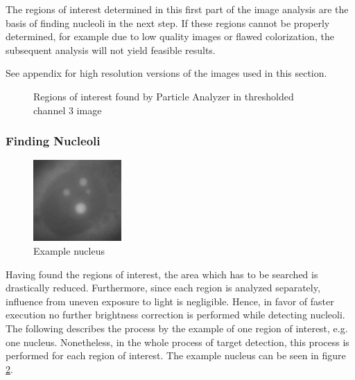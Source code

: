 \documentclass[a4paper, 12pt]{article}
\begin{document}
The regions of interest determined in this first part of the image analysis are
the basis of finding nucleoli in the next step. If these regions cannot be
properly determined, for example due to low quality images or flawed
colorization, the subsequent analysis will not yield feasible results.

See appendix for high resolution versions of the images used in this section.

\begin{figure}[h]
\centering
{}
\caption{Regions of interest found by Particle Analyzer in thresholded channel 3
image}
\label{fig:channel3_rois}
\end{figure}

\subsubsection{Finding Nucleoli}

\begin{figure}
\vspace{-14pt}
\includegraphics[width=0.3\textwidth]{images/example_nucleus}
\caption{Example nucleus}
\label{fig:example_nucleus}
\vspace{-28pt}
\end{figure}
Having found the regions of interest, the area which has to be searched is
drastically reduced. Furthermore, since each region is analyzed separately,
influence from uneven exposure to light is negligible. Hence, in favor of
faster execution no further brightness correction is performed while detecting
nucleoli. The following describes the process by the example of one region of
interest, e.g. one nucleus. Nonetheless, in the whole process of target
detection, this process is performed for each region of interest. The example
nucleus can be seen in figure \ref{fig:example_nucleus}.
\end{document}

